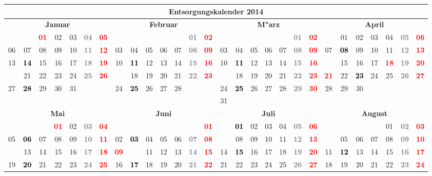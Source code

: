 \documentclass[10pt,a4paper,landscape]{article}
\newcommand{\bb}[1]{\cellcolor{MidnightBlue}\textcolor{white}{\bf #1}}
\newcommand{\yb}[1]{\cellcolor{yellow}\textcolor{black}{\bf #1}}
\newcommand{\rb}[1]{\textbf{\textcolor{red}{#1}}}
\newcommand{\hv}[1]{\textbf{\textcolor{Gray}{#1}}}
\begin{document}
\begin{tabular}{|ccccccc|ccccccc|ccccccc|ccccccc|}
\hline
\multicolumn{28}{|c|}{\textbf{Entsorgungskalender 2014}} \\\hline
\multicolumn{7}{|c|}{\bf Januar} & \multicolumn{7}{|c|}{\bf Februar} & \multicolumn{7}{|c|}{\bf M"arz} & \multicolumn{7}{|c|}{\bf April} \\
& & \rb{01} & 02 & 03 & \hv{04} & \rb{05} & & & & & & \hv{01} & \rb{02} & & & & & & \hv{01} & \rb{02} &  & 01 & 02 & 03 & 04 & \hv{05} & \rb{06} \\
06 & 07 & 08 & 09 & 10 & \hv{11} & \rb{12} & 03 & 04 & 05 & 06 & 07 & \hv{08} & \rb{09} & 03 & 04 & 05 & 06 & 07 & \hv{08} & \rb{09} & 07 & \yb{08} & 09 & 10 & 11 & \hv{12} & \rb{13} \\
13 & \yb{14} & 15 & 16 & 17 & \hv{18} & \rb{19} & 10 & \yb{11} & 12 & 13 & 14 & \hv{15} & \rb{16} & 10 & \yb{11} & 12 & 13 & 14 & \hv{15} & \rb{16} & \bb{14} & 15 & 16 & 17 & \rb{18} & \hv{19} & \rb{20} \\
\bb{20} & 21 & 22 & 23 & 24 & \hv{25} & \rb{26} & \bb{17} & 18 & 19 & 20 & 21 & \hv{22} & \rb{23} & \bb{17} & 18 & 19 & 20 & 21 & \hv{22} & \rb{23} & \rb{21} & 22 & \yb{23} & 24 & 25 & \hv{26} & \rb{27} \\
27 & \yb{28} & 29 & 30 & 31 & & & 24 & \yb{25} & 26 & 27 & 28 & & & 24 & \yb{25} & 26 & 27 & 28 & \hv{29} & \rb{30} & 28 & 29 & 30 &  &  &  &  \\
& & & & & & & & & & & & & & 31 & & & & & & &  &  &  &  &  &  &  \\
\hline
\multicolumn{7}{|c|}{\bf Mai} & \multicolumn{7}{|c|}{\bf Juni} & \multicolumn{7}{|c|}{\bf Juli} & \multicolumn{7}{|c|}{\bf August} \\
& & & \rb{01} & 02 & \hv{03} & \rb{04} & & & & & & & \rb{01} & & \yb{01} & 02 & 03 & 04 & \hv{05} & \rb{06} & & & & & 01 & \hv{02} & \rb{03} \\
05 & \yb{06} & 07 & 08 & 09 & \hv{10} & \rb{11} & 02 & \yb{03} & 04 & 05 & 06 & \hv{07} & \rb{08} & \bb{07} & 08 & 09 & 10 & 11 & \hv{12} & \rb{13} & \bb{04} & 05 & 06 & 07 & 08 & \hv{09} & \rb{10} \\
\bb{12} & 13 & 14 & 15 & 16 & \hv{17} & \rb{18} & \rb{09} & \bb{10} & 11 & 12 & 13 & \hv{14} & \rb{15} & 14 & \yb{15} & 16 & 17 & 18 & \hv{19} & \rb{20} & 11 & \yb{12} & 13 & 14 & 15 & \hv{16} & \rb{17} \\
19 & \yb{20} & 21 & 22 & 23 & \hv{24} & \rb{25} & 16 & \yb{17} & 18 & 19 & 20 & \hv{21} & \rb{22} & 21 & 22 & 23 & 24 & 25 & \hv{26} & \rb{27} & 18 & 19 & 20 & 21 & 22 & \hv{23} & \rb{24} \\

\end{tabular}
\end{document}
